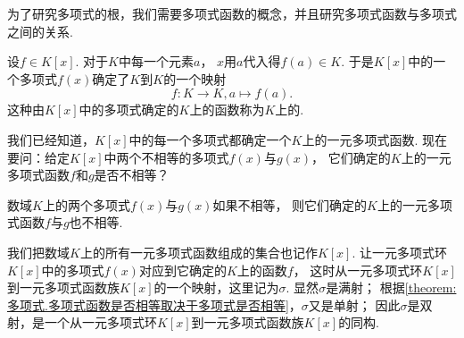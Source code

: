 为了研究多项式的根，我们需要多项式函数的概念，并且研究多项式函数与多项式之间的关系.

设\(f \in K[x]\).
对于\(K\)中每一个元素\(a\)，
\(x\)用\(a\)代入得\(f(a) \in K\).
于是\(K[x]\)中的一个多项式\(f(x)\)确定了\(K\)到\(K\)的一个映射\[
    f\colon K \to K, a \mapsto f(a).
\]
这种由\(K[x]\)中的多项式确定的\(K\)上的函数称为\(K\)上的.

我们已经知道，\(K[x]\)中的每一个多项式都确定一个\(K\)上的一元多项式函数.
现在要问：给定\(K[x]\)中两个不相等的多项式\(f(x)\)与\(g(x)\)，
它们确定的\(K\)上的一元多项式函数\(f\)和\(g\)是否不相等？
\begin{theorem}\label{theorem:多项式.多项式函数是否相等取决于多项式是否相等}
数域\(K\)上的两个多项式\(f(x)\)与\(g(x)\)如果不相等，
则它们确定的\(K\)上的一元多项式函数\(f\)与\(g\)也不相等.
\end{theorem}

我们把数域\(K\)上的所有一元多项式函数组成的集合也记作\(K[x]\).
让一元多项式环\(K[x]\)中的多项式\(f(x)\)对应到它确定的\(K\)上的函数\(f\)，
这时从一元多项式环\(K[x]\)到一元多项式函数族\(K[x]\)的一个映射，这里记为\(\sigma\).
显然\(\sigma\)是满射；
根据\cref{theorem:多项式.多项式函数是否相等取决于多项式是否相等}，\(\sigma\)又是单射；
因此\(\sigma\)是双射，是一个从一元多项式环\(K[x]\)到一元多项式函数族\(K[x]\)的同构.
